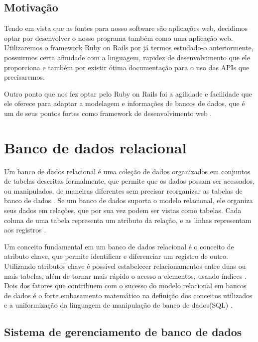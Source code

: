     \subsection{Motivação}
    \label{subsec: Motivos Rails}
Tendo em vista que as fontes para nosso software são aplicações web, decidimos optar por desenvolver o nosso programa também como uma aplicação web. Utilizaremos o framework Ruby on Rails por já termos estudado-o anteriormente, possuirmos certa afinidade com a linguagem, rapidez de desenvolvimento que ele proporciona e também por existir ótima documentação para o uso das APIs que precisaremos.

Outro ponto que nos fez optar pelo Ruby on Rails foi a agilidade e facilidade que ele oferece para adaptar a modelagem e informações de bancos de dados, que é um de seus pontos fortes como framework de desenvolvimento web \cite{AtlasWeb}.
    
\section{Banco de dados relacional}
\label{sec: BDRelacional}

Um banco de dados relacional é uma coleção de dados organizados em conjuntos de tabelas descritas formalmente, que permite que os dados possam ser acessados, ou manipulados, de maneiras diferentes sem precisar reorganizar as tabelas de banco de dados \cite{RelDatabase}.
Se um banco de dados suporta o modelo relacional, ele organiza seus dados em relações, que por sua vez podem ser vistas como tabelas. Cada coluna de uma tabela representa um atributo da relação, e as linhas representam aos registros \cite{BancoRelacional}.

Um conceito fundamental em um banco de dados relacional é o conceito de atributo chave, que permite identificar e diferenciar um registro de outro. Utilizando atributos chave é possível estabelecer relacionamentos entre duas ou mais tabelas, além de tornar mais rápido o acesso a elementos, usando índices \cite{BancoRelacional}.
Dois dos fatores que contribuem com o sucesso do modelo relacional em bancos de dados é o forte embasamento matemático \cite{FundamentosBD} na definição dos conceitos utilizados e a uniformização da linguagem de manipulação de banco de dados(SQL) \cite{BancoRelacional}.

\subsection{Sistema de gerenciamento de banco de dados}
\label{subsec: SGBD}

